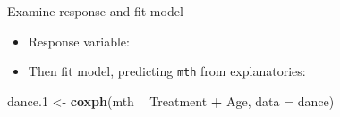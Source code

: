 \documentclass[
  ignorenonframetext,
]{beamer}
\newenvironment{Shaded}{\begin{snugshade}}{\end{snugshade}}
\newcommand{\DataTypeTok}[1]{\textcolor[rgb]{0.13,0.29,0.53}{#1}}
\newcommand{\FloatTok}[1]{\textcolor[rgb]{0.00,0.00,0.81}{#1}}
\newcommand{\KeywordTok}[1]{\textcolor[rgb]{0.13,0.29,0.53}{\textbf{#1}}}
\newcommand{\NormalTok}[1]{#1}
\newcommand{\OperatorTok}[1]{\textcolor[rgb]{0.81,0.36,0.00}{\textbf{#1}}}
\newcommand{\StringTok}[1]{\textcolor[rgb]{0.31,0.60,0.02}{#1}}
\providecommand{\tightlist}{%
  \setlength{\itemsep}{0pt}\setlength{\parskip}{0pt}}
\begin{document}
\begin{frame}[fragile]{Examine response and fit model}
\protect\hypertarget{examine-response-and-fit-model}{}

\begin{itemize}
\tightlist
\item
  Response variable:
\end{itemize}

\small

\begin{Shaded}
\end{Shaded}

\normalsize

\begin{itemize}
\tightlist
\item
  Then fit model, predicting \texttt{mth} from explanatories:
\end{itemize}

\begin{Shaded}
\begin{Highlighting}[]
\NormalTok{dance}\FloatTok{.1}\NormalTok{ <-}\StringTok{ }\KeywordTok{coxph}\NormalTok{(mth }\OperatorTok{~}\StringTok{ }\NormalTok{Treatment }\OperatorTok{+}\StringTok{ }\NormalTok{Age, }\DataTypeTok{data =}\NormalTok{ dance)}
\end{Highlighting}
\end{Shaded}

\end{frame}
\end{document}
